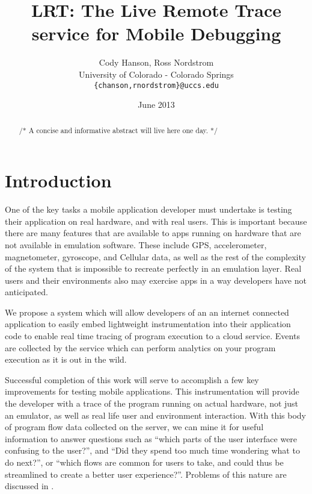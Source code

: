 \documentclass{acm_proc_article-sp}
\begin{document}
\title{LRT: The Live Remote Trace service for Mobile Debugging}
\author{Cody Hanson, Ross Nordstrom\\
        University of Colorado - Colorado Springs\\
        \texttt{\{chanson,rnordstrom\}@uccs.edu}
       }
\date{June 2013}

\maketitle

\begin{abstract}
/* A concise and informative abstract will live here one day. */

\end{abstract}

\section{Introduction}
One of the key tasks a mobile application developer must undertake is testing 
their application on real hardware, and with real users. This is important 
because there are many features that are available to apps running on hardware 
that are not available in emulation software. These include GPS, accelerometer, 
magnetometer, gyroscope, and Cellular data, as well as the rest of the 
complexity of the system that is impossible to recreate perfectly in an 
emulation layer. Real users and their environments also may exercise apps in
a way developers have not anticipated. 

We propose a system which will allow developers of an an internet connected 
application to easily embed lightweight instrumentation 
into their application code to enable real 
time tracing of program execution to a cloud service. Events are collected by 
the service which can perform analytics on your program execution as it is out 
in the wild.

Successful completion of this work will serve to accomplish a few key 
improvements for testing mobile applications. This instrumentation will provide 
the developer with a trace of the program running on actual hardware, not just 
an emulator, as well as real life user and environment interaction. With this 
body of program flow data collected on the server, we can mine it for useful 
information to answer questions such as “which parts of the user interface were 
confusing to the user?”, and “Did they spend too much time wondering what to do 
next?”, or “which flows are common for users to take, and could thus be 
streamlined to create a better user experience?”. Problems of this nature are 
discussed in \cite{WebAntiPattern}.
\end{document}
